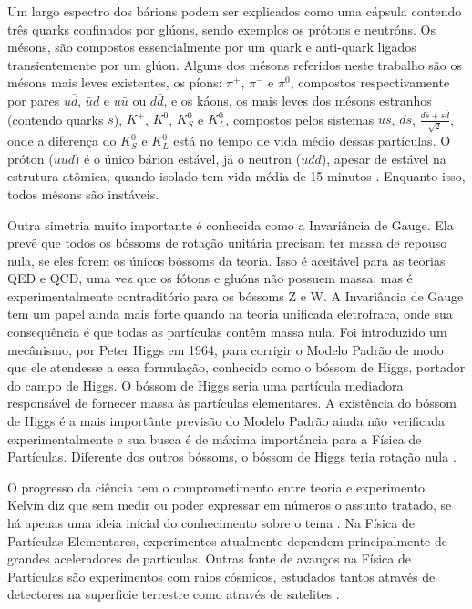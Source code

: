 Um largo espectro dos bárions podem ser explicados como uma cápsula contendo
três quarks confinados por glúons, sendo exemplos os prótons e neutróns. Os mésons, 
são compostos essencialmente por um quark e anti-quark ligados
transientemente por um glúon. Alguns dos mésons referidos neste trabalho são
os mésons mais leves existentes, os píons: $\pi^{+}$,
$\pi^{-}$ e $\pi^{0}$, compostos respectivamente por pares $u\bar{d}$, $\bar{u}d$ e
$u\bar{u}$ ou $d\bar{d}$, e os káons, os mais leves dos mésons estranhos
(contendo quarks $s$), $K^{+}$, $K^{0}$, $K^{0}_{S}$ e $K^{0}_{L}$, 
compostos pelos sistemas $u\bar{s}$, $d\bar{s}$,
$\frac{d\bar{s}+s\bar{d}}{\sqrt{2}}$, onde a diferença do $K^{0}_{S}$ e
$K^{0}_{L}$ está no tempo de vida médio dessas partículas. 
O próton ($uud$) é o único bárion estável, já o neutron ($udd$), apesar de estável na estrutura atômica,
quando isolado tem vida média de 15 minutos \cite{Intro_Standard}. Enquanto
isso, todos mésons são instáveis.
 
Outra simetria muito importante é conhecida como a Invariância de Gauge.
Ela prevê que todos os bóssoms de rotação unitária precisam ter
massa de repouso nula, se eles forem os únicos bóssoms da teoria.
Isso é aceitável para as teorias QED e QCD, uma vez que os
fótons e gluóns não possuem massa, mas é experimentalmente contraditório
para os bóssoms Z e W. A Invariância de Gauge tem um papel ainda mais forte
quando na teoria unificada eletrofraca, onde sua consequência é que todas as
partículas contêm massa nula. Foi introduzido um mecânismo, 
por Peter Higgs em 1964, para corrigir o Modelo Padrão de modo que ele atendesse
a essa formulação, conhecido como o bóssom de Higgs, portador do campo de Higgs. O bóssom de Higgs seria
uma partícula mediadora responsável de fornecer massa às partículas elementares.
A existência do bóssom de Higgs é a mais importânte previsão do Modelo Padrão
ainda não verificada experimentalmente e sua busca é de máxima importância para
a Física de Partículas. Diferente dos outros bóssoms, o
bóssom de Higgs teria rotação nula \cite{Intro_Nuclear}.

O progresso da ciência tem o comprometimento entre teoria e experimento. Kelvin
diz que sem medir ou poder expressar em números o assunto tratado, se há apenas
uma ideia inícial do conhecimento sobre o tema \cite{kelvin}. 
Na Física de Partículas Elementares, experimentos atualmente dependem
principalmente de grandes aceleradores de partículas. Outras fonte de avanços na
Física de Partículas são experimentos com raios cósmicos, estudados tantos
através de detectores na superficie terrestre como através de satelites 
\cite{nature_space_and_time}. 

